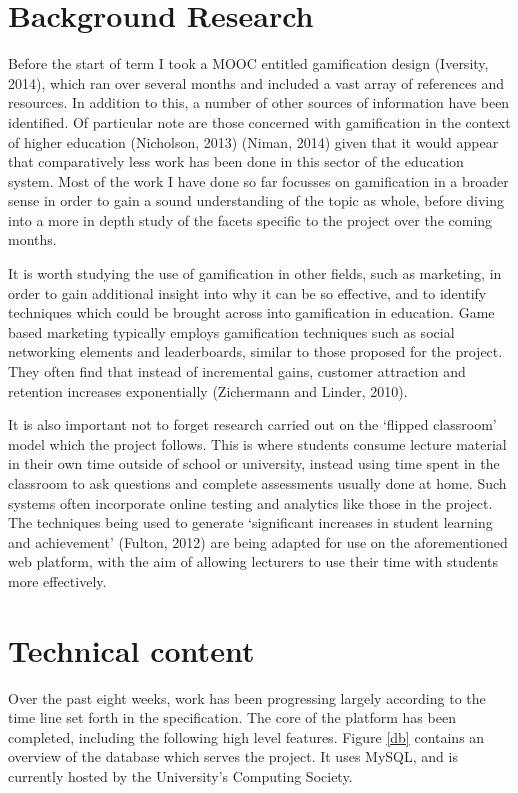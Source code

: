 \documentclass[10pt,a4paper]{report}
\begin{document}
\section*{Background Research}
Before the start of term I took a MOOC entitled gamification design (Iversity, 2014), which ran over several months and included a vast array of references and resources. In addition to this, a number of other sources of information have been identified. Of particular note are those concerned with gamification in the context of higher education (Nicholson, 2013) (Niman, 2014) given that it would appear that comparatively less work has been done in this sector of the education system. Most of the work I have done so far focusses on gamification in a broader sense in order to gain a sound understanding of the topic as whole, before diving into a more in depth study of the facets specific to the project over the coming months.

It is worth studying the use of gamification in other fields, such as marketing, in order to gain additional insight into why it can be so effective, and to identify techniques which could be brought across into gamification in education. Game based marketing typically employs gamification techniques such as social networking elements and leaderboards, similar to those proposed for the project. They often find that instead of incremental gains, customer attraction and retention increases exponentially (Zichermann and Linder, 2010). 

It is also important not to forget research carried out on the `flipped classroom' model which the project follows. This is where students consume lecture material in their own time outside of school or university, instead using time spent in the classroom to ask questions and complete assessments usually done at home. Such systems often incorporate online testing and analytics like those in the project. The techniques being used to generate `significant increases in student learning and achievement' (Fulton, 2012) are being adapted for use on the aforementioned web platform, with the aim of allowing lecturers to use their time with students more effectively.

\section*{Technical content}
Over the past eight weeks, work has been progressing largely according to the time line set forth in the specification. The core of the platform has been completed, including the following high level features. Figure \ref{db} contains an overview of the database which serves the project. It uses MySQL, and is currently hosted by the University's Computing Society.
\end{document}
